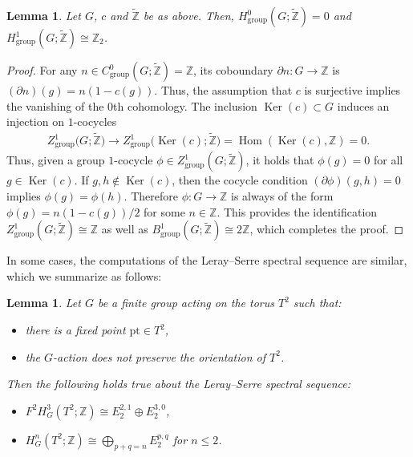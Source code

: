 \documentclass[11pt]{article}
\newtheorem{lem}[thm]{Lemma}
\theoremstyle{definition}
\newcommand{\Z}{\mathbb{Z}}
\newcommand{\pt}{\mathrm{pt}}
\begin{document}
\begin{lem} \label{lem:group_coh_orientation_coeff}
Let $G$, $c$ and $\tilde{\Z}$ be as above. Then, $H^0_{\mathrm{group}}(G; \tilde{\Z}) = 0$ and $H^1_{\mathrm{group}}(G; \tilde{\Z}) \cong \Z_2$.
\end{lem}

\begin{proof}For any $n \in C^0_{\mathrm{group}}(G; \tilde{\Z}) = \Z$, its coboundary $\partial n\colon G \to \Z$ is $(\partial n)(g) = n(1 - c(g))$. Thus, the assumption that $c$ is surjective implies the vanishing of the $0$th cohomology. The inclusion $\operatorname{Ker}(c) \subset G$ induces an injection on $1$-cocycles
\begin{gather*}
Z^1_{\mathrm{group}}\big(G; \tilde{\Z}\big) \to Z^1_{\mathrm{group}}\big(\operatorname{Ker}(c); \tilde{\Z}\big) = \operatorname{Hom}(\operatorname{Ker}(c), \Z) = 0.
\end{gather*}
Thus, given a group $1$-cocycle $\phi \in Z^1_{\mathrm{group}}(G; \tilde{\Z})$, it holds that $\phi(g) = 0$ for all $g \in \operatorname{Ker}(c)$. If $g, h \not\in \operatorname{Ker}(c)$, then the cocycle condition $(\partial \phi)(g, h) = 0$ implies $\phi(g) = \phi(h)$. Therefore $\phi \colon G \to \Z$ is always of the form $\phi(g) = n (1 - c(g))/2$ for some $n \in \Z$. This provides the identif\/ication $Z^1_{\mathrm{group}}(G; \tilde{\Z}) \cong \Z$ as well as $B^1_{\mathrm{group}}(G; \tilde{\Z}) \cong 2\Z$, which completes the proof.
\end{proof}

In some cases, the computations of the Leray--Serre spectral sequence are similar, which we summarize as follows:

\begin{lem} \label{lem:typical_argument_non_orientation_preserving_case}
Let $G$ be a finite group acting on the torus $T^2$ such that:
\begin{itemize}\itemsep=0pt
\item there is a fixed point $\pt \in T^2$,

\item the $G$-action does not preserve the orientation of $T^2$.
\end{itemize}
Then the following holds true about the Leray--Serre spectral sequence:
\begin{itemize}\itemsep=0pt
\item[$(a)$] $F^2H^3_G(T^2; \Z) \cong E_2^{2, 1} \oplus E_2^{3, 0}$,

\item[$(b)$] $H^n_G(T^2; \Z) \cong \bigoplus_{p + q = n} E_2^{p, q}$ for $n \le 2$.
\end{itemize}
\end{lem}
\end{document}
